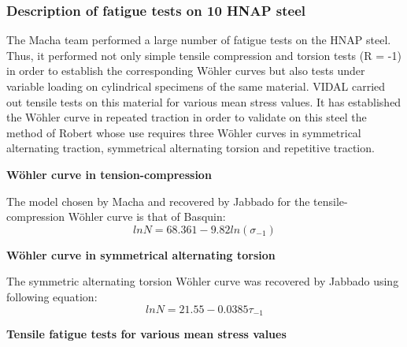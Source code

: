 \documentclass[3p,times,number,review]{elsarticle}
\begin{document}
\subsubsection{Description of fatigue tests on 10 HNAP steel}
The Macha team performed a large number of fatigue tests on the HNAP steel. Thus, it performed not only simple tensile compression and torsion tests (R = -1) in order to establish the corresponding Wöhler curves but also tests under variable loading on cylindrical specimens of the same material\cite{ACHTELIC1994}. VIDAL\cite{VIDAL1996} carried out tensile tests on this material for various mean stress values. It has established the Wöhler curve in repeated traction in order to validate on this steel the method of Robert whose use requires three Wöhler curves in symmetrical alternating traction, symmetrical alternating torsion and repetitive traction.

\vspace{6pt}
\noindent
\textbf{Wöhler curve in tension-compression}

The model chosen by Macha and recovered by Jabbado\cite{jabbado:pastel-00002116} for the tensile-compression Wöhler curve is that of Basquin:
\begin{equation}
lnN=68.361 − 9.82ln\left( \sigma_{-1}\right) 
\end{equation}

\noindent
\textbf{Wöhler curve in symmetrical alternating torsion}

The symmetric alternating torsion Wöhler curve was recovered by Jabbado\cite{jabbado:pastel-00002116} using following equation:
\begin{equation}
lnN=21.55 − 0.0385\tau_{-1}
\end{equation}

\noindent
\textbf{Tensile fatigue tests for various mean stress values}
\end{document}
